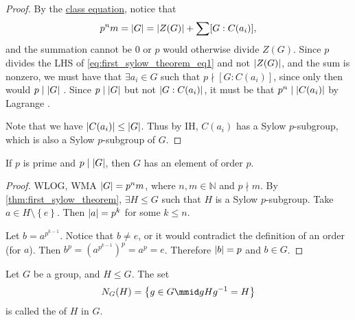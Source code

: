 \documentclass[notoc,notitlepage]{tufte-book}
\begin{document}
\begin{proof}
  \noindent
  By the \hyperref[crly:class_equation]{class equation},
  notice that
  \begin{equation}\label{eq:first_sylow_theorem_eq1}
    p^n m = \left|G\right| = \left|Z(G)\right| + \sum [ G : C(a_i) ],
  \end{equation}
  and the summation cannot be $0$ or $p$ would otherwise
  divide $Z(G)$.
  Since $p$ divides the LHS of \cref{eq:first_sylow_theorem_eq1} and not
  $\left|Z(G)\right|$, and the sum is nonzero, we must have that $\exists a_i \in G$
  such that $p \nmid [ G : C(a_i) ]$, since only then would $p \mid \left|G\right|$
  .
  Since $p \mid \left|G\right|$ but not $\left| G : C(a_i)\right|$, it must be that $p^n \mid
  \left|C(a_i)\right|$ by Lagrange
  .

  Note that we have $\left|C(a_i)\right| \leq \left|G\right|$.  Thus by IH, $C(a_i)$ has a
  Sylow $p$-subgroup, which is also a Sylow $p$-subgroup of $G$.
\end{proof}

\begin{crly}\label{crly:cauchy_s_theorem}
  If $p$ is prime and $p \mid \left|G\right|$, then $G$ has an element of order $p$.
\end{crly}

\begin{proof}
  WLOG, WMA $\left|G\right| = p^n m$, where $n, m \in \mathbb{N}$ and
  $p \nmid m$. By \cref{thm:first_sylow_theorem}, $\exists H \leq G$
  such that $H$ is a Sylow $p$-subgroup.
  Take $a \in H \setminus \left\{ e \right\}$. Then $\left|a\right| = p^k$
  for some $k \leq n$.

  Let $b = a^{p^{k - 1}}$. Notice that $b \neq e$, or it would
  contradict the definition of an order (for $a$).
  Then $b^p = \left( a^{p^{k - 1}} \right)^p = a^p = e$.
  Therefore $\left|b\right| = p$ and $b \in G$.
\end{proof}

\begin{defn}[Normalizer]\label{defn:normalizer}
  Let $G$ be a group, and $H \leq G$. The set
  \begin{equation*}
    N_G(H) = \left\{ g \in G \mmid gHg^{-1} = H \right\}
  \end{equation*}
  is called the  of $H$ in $G$.
\end{defn}
\end{document}

